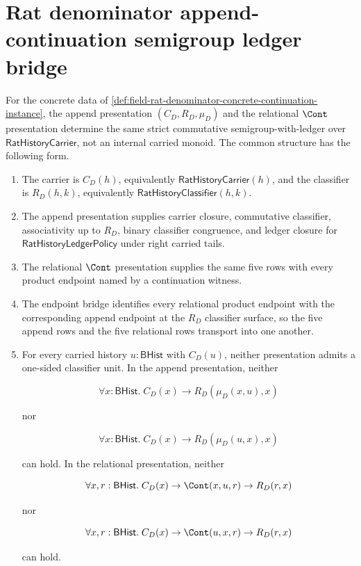\section{Rat denominator append-continuation semigroup ledger bridge}
\label{sec:field-rat-denominator-append-continuation-strict-semigroup-nonmonoid-bridge}

\begin{theorem}
\label{thm:field-rat-denominator-append-continuation-strict-semigroup-nonmonoid-bridge}
For the concrete data of
\autoref{def:field-rat-denominator-concrete-continuation-instance}, the append
presentation $(C_D,R_D,\mu_D)$ and the relational $\Cont$ presentation determine
the same strict commutative semigroup-with-ledger over
$\mathsf{RatHistoryCarrier}$, not an internal carried monoid. The common
structure has the following form.
\begin{enumerate}
  \item The carrier is $C_D(h)$, equivalently
  $\mathsf{RatHistoryCarrier}(h)$, and the classifier is $R_D(h,k)$,
  equivalently $\mathsf{RatHistoryClassifier}(h,k)$.
  \item The append presentation supplies carrier closure, commutative
  classifier, associativity up to $R_D$, binary classifier congruence, and
  ledger closure for $\mathsf{RatHistoryLedgerPolicy}$ under right carried
  tails.
  \item The relational $\Cont$ presentation supplies the same five rows with
  every product endpoint named by a continuation witness.
  \item The endpoint bridge identifies every relational product endpoint with
  the corresponding append endpoint at the $R_D$ classifier surface, so the five
  append rows and the five relational rows transport into one another.
  \item For every carried history $u:\mathsf{BHist}$ with $C_D(u)$, neither
  presentation admits a one-sided classifier unit. In the append presentation,
  neither

  $$
  \forall x:\mathsf{BHist}.\;
  C_D(x)\to R_D(\mu_D(x,u),x)
  $$

  nor

  $$
  \forall x:\mathsf{BHist}.\;
  C_D(x)\to R_D(\mu_D(u,x),x)
  $$

  can hold. In the relational presentation, neither

  $$
  \forall x,r:\mathsf{BHist}.\;
  C_D(x)\to \Cont(x,u,r)\to R_D(r,x)
  $$

  nor

  $$
  \forall x,r:\mathsf{BHist}.\;
  C_D(x)\to \Cont(u,x,r)\to R_D(r,x)
  $$

  can hold.
\end{enumerate}
\end{theorem}
